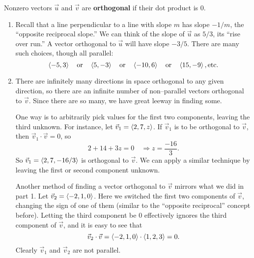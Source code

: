 {Nonzero vectors $\vec u$ and $\vec v$ are \textbf{orthogonal} if their dot product is 0.
}


{\begin{enumerate}
	\item Recall that a line perpendicular to a line with slope $m$ has slope $-1/m$, the ``opposite reciprocal slope.'' We can think of the slope of $\vec u$ as $5/3$, its ``rise over run.'' A vector orthogonal to $\vec u$ will have slope $-3/5$. There are many such choices, though all parallel:
	$$\left\langle -5,3\right\rangle \quad \text{or} \quad\left\langle 5,-3\right\rangle \quad \text{or} \quad \left\langle -10,6\right\rangle\quad \text{or} \quad \left\langle 15,-9\right\rangle,\text{etc.}$$
	\item		There are infinitely many directions in space orthogonal to any given direction, so there are an infinite number of non--parallel vectors orthogonal to $\vec v$. Since there are so many, we have great leeway in finding some.
	
	One way is to arbitrarily pick values for the first two components, leaving the third unknown. For instance, let $\vec v_1 = \left\langle 2,7,z\right\rangle$. If $\vec v_1$ is to be orthogonal to $\vec v$, then $\vec v_1\cdot\vec v = 0$, so 
	$$2+14+3z=0 \quad \Rightarrow z = \frac{-16}{3}.$$
	So $\vec v_1 = \left\langle 2, 7, -16/3\right\rangle$ is orthogonal to $\vec v$. We can apply a similar technique by leaving the first or second component unknown.
	
	Another method of finding a vector orthogonal to $\vec v$ mirrors what we did in part 1. Let $\vec v_2 = \left\langle-2,1,0\right\rangle$. Here we switched the first two components of $\vec v$, changing the sign of one of them (similar to the ``opposite reciprocal'' concept before). Letting the third component be 0 effectively ignores the third component of $\vec v$, and it is easy to see that 
	$$\vec v_2\cdot\vec v = \left\langle -2,1,0\right\rangle\cdot\left\langle 1,2,3\right\rangle = 0.$$
	Clearly $\vec v_1$ and $\vec v_2$ are not parallel.
\end{enumerate}
\baselineskip
}\\


